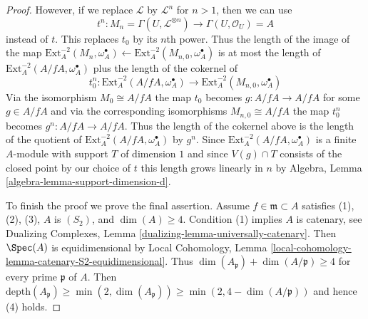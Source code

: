 \begin{proof}
\medskip\noindent
However, if we replace $\mathcal{L}$ by $\mathcal{L}^n$ for $n > 1$,
then we can use
$$
t^n :
M_n = \Gamma(U, \mathcal{L}^{\otimes n})
\longrightarrow
\Gamma(U, \mathcal{O}_U) = A
$$
instead of $t$. This replaces $t_0$ by its $n$th power.
Thus the length of the image of the map
$\text{Ext}^{-2}_A(M_n, \omega_A^\bullet) \leftarrow
\text{Ext}^{-2}_A(M_{n, 0}, \omega_A^\bullet)$
is at most the length of $\text{Ext}^{-2}_A(A/fA, \omega_A^\bullet)$
plus the length of the cokernel of
$$
t_0^n : 
\text{Ext}^{-2}_A(A/fA, \omega_A^\bullet)
\longrightarrow
\text{Ext}^{-2}_A(M_{n, 0}, \omega_A^\bullet)
$$
Via the isomorphism $M_0 \cong A/fA$ the map $t_0$ becomes
$g : A/fA \to A/fA$ for some $g \in A/fA$ and via the corresponding
isomorphisms $M_{n, 0} \cong A/fA$ the map $t_0^n$ becomes
$g^n : A/fA \to A/fA$. Thus the length of the cokernel above
is the length of the quotient of
$\text{Ext}^{-2}_A(A/fA, \omega_A^\bullet)$ by $g^n$.
Since $\text{Ext}^{-2}_A(A/fA, \omega_A^\bullet)$ is a finite $A$-module
with support $T$ of dimension $1$ and since $V(g) \cap T$
consists of the closed point by our choice of $t$
this length grows linearly in $n$ by
Algebra, Lemma \ref{algebra-lemma-support-dimension-d}.

\medskip\noindent
To finish the proof we prove the final assertion. Assume
$f \in \mathfrak m \subset A$ satisfies
(1), (2), (3), $A$ is $(S_2)$, and $\dim(A) \geq 4$.
Condition (1) implies $A$ is catenary, see
Dualizing Complexes, Lemma \ref{dualizing-lemma-universally-catenary}.
Then $\Spec(A)$ is equidimensional by Local Cohomology, Lemma
\ref{local-cohomology-lemma-catenary-S2-equidimensional}.
Thus $\dim(A_\mathfrak p) + \dim(A/\mathfrak p) \geq 4$
for every prime $\mathfrak p$ of $A$. Then
$\text{depth}(A_\mathfrak p) \geq \min(2, \dim(A_\mathfrak p))
\geq \min(2, 4 - \dim(A/\mathfrak p))$ and hence (4) holds.
\end{proof}

